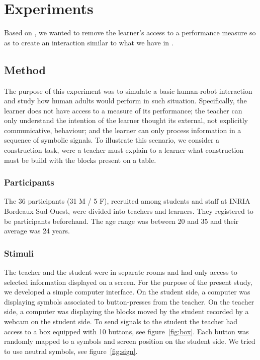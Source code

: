 \section{Experiments}

Based on \cite{griffiths2012bottom}, we wanted to remove the learner's access to a performance measure so as to create an interaction similar to what we have in \cite{grizou2013robot}.

\subsection{Method}


The purpose of this experiment was to simulate a basic human-robot interaction and study how human adults would perform in such situation. Specifically, the learner does not have access to a measure of its performance; the teacher can only understand the intention of the learner thought its external, not explicitly communicative, behaviour; and the learner can only process information in a sequence of symbolic signals. To illustrate this scenario, we consider a construction task, were a teacher must explain to a learner what construction must be build with the blocks present on a table.


\subsubsection{Participants}

The 36 participants (31 M / 5 F), recruited among students and staff at INRIA Bordeaux Sud-Ouest, were divided into teachers and learners. They registered to be participants beforehand. The age range was between 20 and 35 and their average was 24 years.

\subsubsection{Stimuli}

The teacher and the student were in separate rooms and had only access to selected information displayed on a screen. For the purpose of the present study, we developed a simple computer interface. On the student side, a computer was displaying symbols associated to button-presses from the teacher. On the teacher side, a computer was displaying the blocks moved by the student recorded by a webcam on the student side. To send signals to the student the teacher had access to a box equipped with 10 buttons, see figure~\ref{fig:box}. Each button was randomly mapped to a symbols and screen position on the student side. We tried to use neutral symbols, see figure~\ref{fig:sign}.

